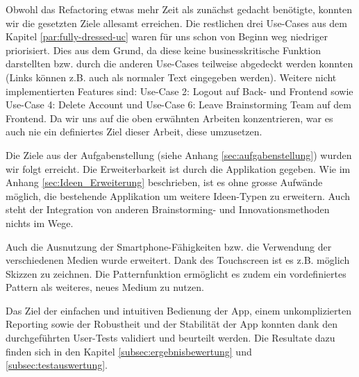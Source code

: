 Obwohl das Refactoring etwas mehr Zeit als zunächst gedacht benötigte, konnten wir die gesetzten Ziele allesamt erreichen. Die restlichen drei Use-Cases aus dem Kapitel \ref{par:fully-dressed-uc} waren für uns schon von Beginn weg niedriger priorisiert. Dies aus dem Grund, da diese keine businesskritische Funktion darstellten bzw. durch die anderen Use-Cases teilweise abgedeckt werden konnten (Links können z.B. auch als normaler Text eingegeben werden). Weitere nicht implementierten Features sind: Use-Case 2: Logout auf Back- und Frontend sowie Use-Case 4: Delete Account und Use-Case 6: Leave Brainstorming Team auf dem Frontend. Da wir uns auf die oben erwähnten Arbeiten konzentrieren, war es auch nie ein definiertes Ziel dieser Arbeit, diese umzusetzen. 

Die Ziele aus der Aufgabenstellung (siehe Anhang \ref{sec:aufgabenstellung}) wurden wir folgt erreicht. Die Erweiterbarkeit ist durch die Applikation gegeben. Wie im Anhang \ref{sec:Ideen_Erweiterung} beschrieben, ist es ohne grosse Aufwände möglich, die bestehende Applikation um weitere Ideen-Typen zu erweitern. Auch steht der Integration von anderen Brainstorming- und Innovationsmethoden nichts im Wege.

Auch die Ausnutzung der Smartphone-Fähigkeiten bzw. die Verwendung der verschiedenen Medien wurde erweitert. Dank des Touchscreen ist es z.B. möglich Skizzen zu zeichnen. Die Patternfunktion ermöglicht es zudem ein vordefiniertes Pattern als weiteres, neues Medium zu nutzen.

Das Ziel der einfachen und intuitiven Bedienung der App, einem unkomplizierten Reporting sowie der Robustheit und der Stabilität der App konnten dank den durchgeführten User-Tests validiert und beurteilt werden. Die Resultate dazu finden sich in den Kapitel \ref{subsec:ergebnisbewertung} und \ref{subsec:testauswertung}.